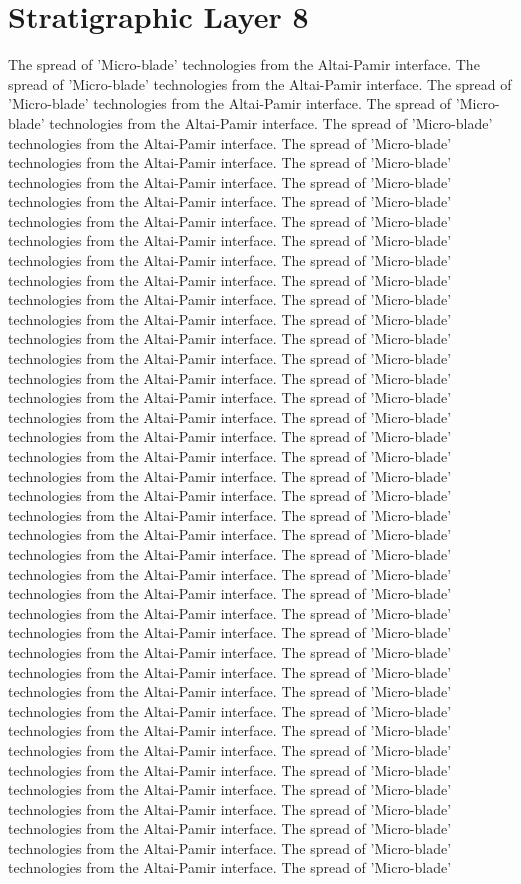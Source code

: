 \section{Stratigraphic Layer 8}
The spread of 'Micro-blade' technologies from the Altai-Pamir interface. The spread of 'Micro-blade' technologies from the Altai-Pamir interface. The spread of 'Micro-blade' technologies from the Altai-Pamir interface. The spread of 'Micro-blade' technologies from the Altai-Pamir interface. The spread of 'Micro-blade' technologies from the Altai-Pamir interface. The spread of 'Micro-blade' technologies from the Altai-Pamir interface. The spread of 'Micro-blade' technologies from the Altai-Pamir interface. The spread of 'Micro-blade' technologies from the Altai-Pamir interface. The spread of 'Micro-blade' technologies from the Altai-Pamir interface. The spread of 'Micro-blade' technologies from the Altai-Pamir interface. The spread of 'Micro-blade' technologies from the Altai-Pamir interface. The spread of 'Micro-blade' technologies from the Altai-Pamir interface. The spread of 'Micro-blade' technologies from the Altai-Pamir interface. The spread of 'Micro-blade' technologies from the Altai-Pamir interface. The spread of 'Micro-blade' technologies from the Altai-Pamir interface. The spread of 'Micro-blade' technologies from the Altai-Pamir interface. The spread of 'Micro-blade' technologies from the Altai-Pamir interface. The spread of 'Micro-blade' technologies from the Altai-Pamir interface. The spread of 'Micro-blade' technologies from the Altai-Pamir interface. The spread of 'Micro-blade' technologies from the Altai-Pamir interface. The spread of 'Micro-blade' technologies from the Altai-Pamir interface. The spread of 'Micro-blade' technologies from the Altai-Pamir interface. The spread of 'Micro-blade' technologies from the Altai-Pamir interface. The spread of 'Micro-blade' technologies from the Altai-Pamir interface. The spread of 'Micro-blade' technologies from the Altai-Pamir interface. The spread of 'Micro-blade' technologies from the Altai-Pamir interface. The spread of 'Micro-blade' technologies from the Altai-Pamir interface. The spread of 'Micro-blade' technologies from the Altai-Pamir interface. The spread of 'Micro-blade' technologies from the Altai-Pamir interface. The spread of 'Micro-blade' technologies from the Altai-Pamir interface. The spread of 'Micro-blade' technologies from the Altai-Pamir interface. The spread of 'Micro-blade' technologies from the Altai-Pamir interface. The spread of 'Micro-blade' technologies from the Altai-Pamir interface. The spread of 'Micro-blade' technologies from the Altai-Pamir interface. The spread of 'Micro-blade' technologies from the Altai-Pamir interface. The spread of 'Micro-blade' technologies from the Altai-Pamir interface. The spread of 'Micro-blade' technologies from the Altai-Pamir interface. The spread of 'Micro-blade' technologies from the Altai-Pamir interface. The spread of 'Micro-blade' technologies from the Altai-Pamir interface. The spread of 'Micro-blade' technologies from the Altai-Pamir interface. The spread of 'Micro-blade' technologies from the Altai-Pamir interface. The spread of 'Micro-blade' technologies from the Altai-Pamir interface. The spread of 'Micro-blade' 